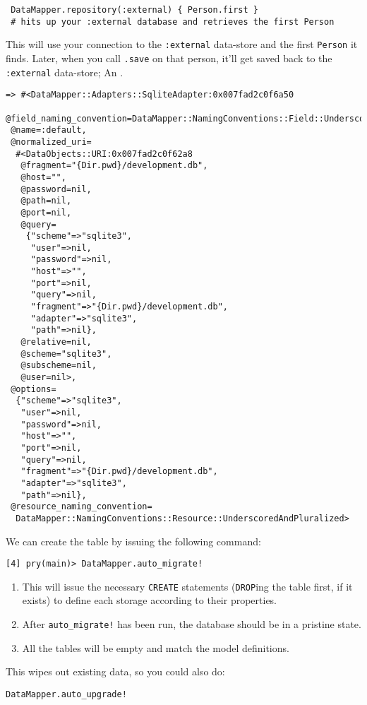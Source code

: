 \begin{verbatim}
 DataMapper.repository(:external) { Person.first }
 # hits up your :external database and retrieves the first Person
\end{verbatim}
This will use your connection to the \verb|:external|
 data-store and the first
\verb|Person| it finds. Later, when you call \verb|.save| 
on that person, it'll get
saved back to the \verb|:external| data-store; 
An .

\begin{verbatim}
=> #<DataMapper::Adapters::SqliteAdapter:0x007fad2c0f6a50
 @field_naming_convention=DataMapper::NamingConventions::Field::Underscored,
 @name=:default,
 @normalized_uri=
  #<DataObjects::URI:0x007fad2c0f62a8
   @fragment="{Dir.pwd}/development.db",
   @host="",
   @password=nil,
   @path=nil,
   @port=nil,
   @query=
    {"scheme"=>"sqlite3",
     "user"=>nil,
     "password"=>nil,
     "host"=>"",
     "port"=>nil,
     "query"=>nil,
     "fragment"=>"{Dir.pwd}/development.db",
     "adapter"=>"sqlite3",
     "path"=>nil},
   @relative=nil,
   @scheme="sqlite3",
   @subscheme=nil,
   @user=nil>,
 @options=
  {"scheme"=>"sqlite3",
   "user"=>nil,
   "password"=>nil,
   "host"=>"",
   "port"=>nil,
   "query"=>nil,
   "fragment"=>"{Dir.pwd}/development.db",
   "adapter"=>"sqlite3",
   "path"=>nil},
 @resource_naming_convention=
  DataMapper::NamingConventions::Resource::UnderscoredAndPluralized>
\end{verbatim}

We can create the table by issuing the following command:
\begin{verbatim}
[4] pry(main)> DataMapper.auto_migrate!
\end{verbatim}
\begin{enumerate}
\item 
This will issue the necessary \verb|CREATE| statements (\verb|DROP|ing
the table first, if it exists) to define each storage according to
their properties. 
\item 
After \verb|auto_migrate!| has been run, the
database should be in a pristine state. 
\item 
All the tables will be empty
and match the model definitions.
\end{enumerate}

This wipes out existing data, so you could also do:
\begin{verbatim}
DataMapper.auto_upgrade!
\end{verbatim}


